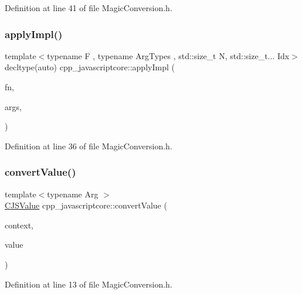 Definition at line 41 of file Magic\+Conversion.\+h.

\mbox{\label{namespacecpp__javascriptcore_a2c32796cd818b3a75a7dc6f033b4a596}} 
\subsubsection{\texorpdfstring{apply\+Impl()}{applyImpl()}}
{\footnotesize\ttfamily template$<$typename F , typename Arg\+Types , std\+::size\+\_\+t N, std\+::size\+\_\+t... Idx$>$ \\
decltype(auto) cpp\+\_\+javascriptcore\+::apply\+Impl (\begin{DoxyParamCaption}\item[{F}]{fn,  }\item[{Arg\+Types \&}]{args,  }\item[{std\+::index\+\_\+sequence$<$ Idx... $>$}]{ }\end{DoxyParamCaption})}



Definition at line 36 of file Magic\+Conversion.\+h.

\mbox{\label{namespacecpp__javascriptcore_a2ae1cd64b14aa12f56f503463a3dede6}} 
\subsubsection{\texorpdfstring{convert\+Value()}{convertValue()}}
{\footnotesize\ttfamily template$<$typename Arg $>$ \\
\mbox{\hyperlink{classcpp__javascriptcore_1_1_c_j_s_value}{C\+J\+S\+Value}} cpp\+\_\+javascriptcore\+::convert\+Value (\begin{DoxyParamCaption}\item[{J\+S\+Context\+Ref}]{context,  }\item[{Arg}]{value }\end{DoxyParamCaption})}



Definition at line 13 of file Magic\+Conversion.\+h.

